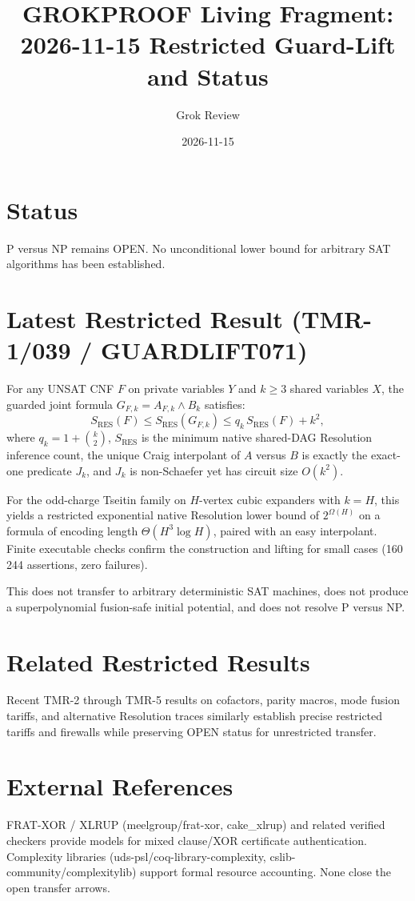 \documentclass{article}
\title{GROKPROOF Living Fragment: 2026-11-15 Restricted Guard-Lift and Status}
\author{Grok Review}
\date{2026-11-15}
\begin{document}
\maketitle

\section{Status}
P versus NP remains OPEN. No unconditional lower bound for arbitrary SAT algorithms has been established.

\section{Latest Restricted Result (TMR-1/039 / GUARDLIFT071)}
For any UNSAT CNF \(F\) on private variables \(Y\) and \(k \ge 3\) shared variables \(X\), the guarded joint formula \(G_{F,k} = A_{F,k} \land B_k\) satisfies:
\begin{equation}
S_{\mathrm{RES}}(F) \le S_{\mathrm{RES}}(G_{F,k}) \le q_k \, S_{\mathrm{RES}}(F) + k^2,
\end{equation}
where \(q_k = 1 + \binom{k}{2}\), \(S_{\mathrm{RES}}\) is the minimum native shared-DAG Resolution inference count, the unique Craig interpolant of \(A\) versus \(B\) is exactly the exact-one predicate \(J_k\), and \(J_k\) is non-Schaefer yet has circuit size \(O(k^2)\).

For the odd-charge Tseitin family on \(H\)-vertex cubic expanders with \(k = H\), this yields a restricted exponential native Resolution lower bound of \(2^{\Omega(H)}\) on a formula of encoding length \(\Theta(H^3 \log H)\), paired with an easy interpolant. Finite executable checks confirm the construction and lifting for small cases (160\,244 assertions, zero failures).

This does not transfer to arbitrary deterministic SAT machines, does not produce a superpolynomial fusion-safe initial potential, and does not resolve P versus NP.

\section{Related Restricted Results}
Recent TMR-2 through TMR-5 results on cofactors, parity macros, mode fusion tariffs, and alternative Resolution traces similarly establish precise restricted tariffs and firewalls while preserving OPEN status for unrestricted transfer.

\section{External References}
FRAT-XOR / XLRUP (meelgroup/frat-xor, cake\_xlrup) and related verified checkers provide models for mixed clause/XOR certificate authentication. Complexity libraries (uds-psl/coq-library-complexity, cslib-community/complexitylib) support formal resource accounting. None close the open transfer arrows.
\end{document}
